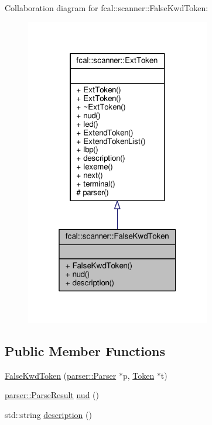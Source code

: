 Collaboration diagram for fcal\+:\+:scanner\+:\+:False\+Kwd\+Token\+:
\nopagebreak
\begin{figure}[H]
\begin{center}
\leavevmode
\includegraphics[width=229pt]{classfcal_1_1scanner_1_1FalseKwdToken__coll__graph}
\end{center}
\end{figure}
\subsection*{Public Member Functions}
\begin{DoxyCompactItemize}
\item 
\hyperlink{classfcal_1_1scanner_1_1FalseKwdToken_ac35ad99acd8ed526d7e7a5d5216b060e}{False\+Kwd\+Token} (\hyperlink{classfcal_1_1parser_1_1Parser}{parser\+::\+Parser} $\ast$p, \hyperlink{classfcal_1_1scanner_1_1Token}{Token} $\ast$t)
\item 
\hyperlink{classfcal_1_1parser_1_1ParseResult}{parser\+::\+Parse\+Result} \hyperlink{classfcal_1_1scanner_1_1FalseKwdToken_a57566622065242fe629d5f991022cdac}{nud} ()
\item 
std\+::string \hyperlink{classfcal_1_1scanner_1_1FalseKwdToken_ad03d22a5baf8377d409dcae104cfc997}{description} ()
\end{DoxyCompactItemize}
